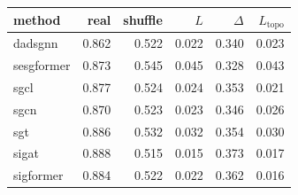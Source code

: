 \begin{tabular}{lrrrrr}
\toprule
method & real & shuffle & $L$ & $\Delta$ & $L_{\text{topo}}$ \\
\midrule
dadsgnn & 0.862 & 0.522 & 0.022 & 0.340 & 0.023 \\
sesgformer & 0.873 & 0.545 & 0.045 & 0.328 & 0.043 \\
sgcl & 0.877 & 0.524 & 0.024 & 0.353 & 0.021 \\
sgcn & 0.870 & 0.523 & 0.023 & 0.346 & 0.026 \\
sgt & 0.886 & 0.532 & 0.032 & 0.354 & 0.030 \\
sigat & 0.888 & 0.515 & 0.015 & 0.373 & 0.017 \\
sigformer & 0.884 & 0.522 & 0.022 & 0.362 & 0.016 \\
\bottomrule
\end{tabular}
